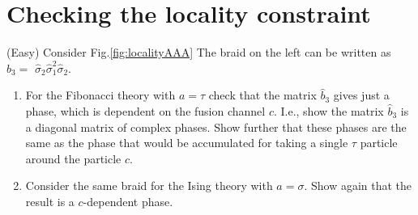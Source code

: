 \section{Checking the locality constraint}
(Easy) Consider Fig.\ref{fig:localityAAA} The braid on the left can be written as $\hat{b}_{3} =$ $\hat{\sigma }_{2}\hat{\sigma }_{1}^{2}\hat{\sigma }_{2}$.
\begin{enumerate}
\item For the Fibonacci theory with $a=\tau $ check that the matrix $\hat{b}_{3}$ gives just a phase, which is dependent on the fusion channel $c$. I.e., show the matrix $\hat{b}_{3}$ is a diagonal matrix of complex phases. Show further that these phases are the same as the phase that would be accumulated for taking a single $\tau $ particle around the particle $c$.
\item Consider the same braid for the Ising theory with $a=\sigma $. Show again that the result is a $c$-dependent phase.
\end{enumerate}

